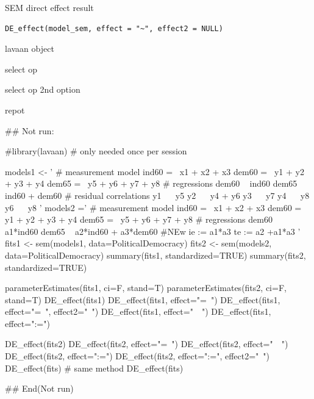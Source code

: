 \documentclass[a4paper]{book}
\begin{document}
%
\begin{Description}
SEM direct effect result
\end{Description}
%
\begin{Usage}
\begin{verbatim}
DE_effect(model_sem, effect = "~", effect2 = NULL)
\end{verbatim}
\end{Usage}
%
\begin{Arguments}
\begin{ldescription}
\item[\code{model\_sem}] lavaan object

\item[\code{effect}] select op

\item[\code{effect2}] select op 2nd option
\end{ldescription}
\end{Arguments}
%
\begin{Value}
repot
\end{Value}
%
\begin{Examples}
\begin{ExampleCode}
\#\# Not run: 

 #library(lavaan) # only needed once per session

models1 <- '
  # measurement model
    ind60 =~ x1 + x2 + x3
    dem60 =~ y1 + y2 + y3 + y4
    dem65 =~ y5 + y6 + y7 + y8
    # regressions
    dem60 ~ ind60
    dem65 ~ ind60 + dem60
      # residual correlations
    y1 ~~ y5
    y2 ~~ y4 + y6
    y3 ~~ y7
    y4 ~~ y8
    y6 ~~ y8
'
models2 ='
  # measurement model
    ind60 =~ x1 + x2 + x3
    dem60 =~ y1 + y2 + y3 + y4
    dem65 =~ y5 + y6 + y7 + y8
     # regressions
    dem60 ~ a1*ind60
    dem65 ~ a2*ind60 + a3*dem60
 #NEw
   ie := a1*a3
   te := a2 +a1*a3
'
fits1 <- sem(models1, data=PoliticalDemocracy)
fits2 <- sem(models2, data=PoliticalDemocracy)
summary(fits1, standardized=TRUE)
summary(fits2, standardized=TRUE)

parameterEstimates(fits1, ci=F, stand=T)
parameterEstimates(fits2, ci=F, stand=T)
DE_effect(fits1)
DE_effect(fits1, effect="=~")
DE_effect(fits1, effect="=~", effect2="~")
DE_effect(fits1, effect="~~")
DE_effect(fits1, effect=":=")

DE_effect(fits2)
DE_effect(fits2, effect="=~")
DE_effect(fits2, effect="~~")
DE_effect(fits2, effect=":=")
DE_effect(fits2, effect=":=", effect2="~")
 DE_effect(fits)%
 # same method
 DE_effect(fits)%


## End(Not run)


\end{ExampleCode}
\end{Examples}
\end{document}
